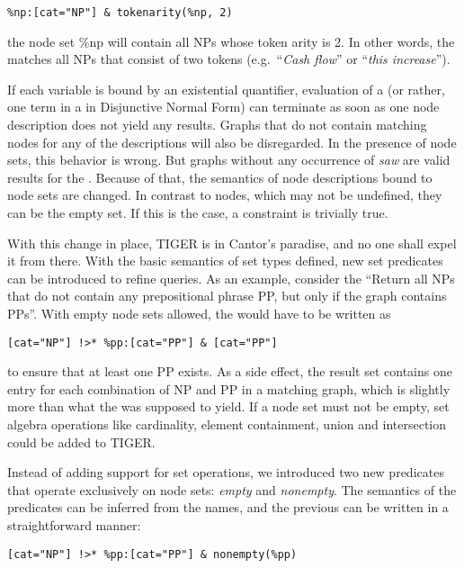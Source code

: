 \documentclass[output=paper]{LSP/langsci}
\begin{document}
\ea
\begin{lstlisting}
%np:[cat="NP"] & tokenarity(%np, 2)
\end{lstlisting}
\z

\noindent the node set \%np will contain all NPs whose token arity is 2. In other words, the  matches all NPs that consist of two tokens (e.g.~``\textit{Cash flow}'' or ``\textit{this increase}''). 

If each variable is bound by an existential quantifier, evaluation of a  (or rather, one term in a  in Disjunctive Normal Form) can terminate as soon as one node description does not yield any results. Graphs that do not contain matching nodes for any of the descriptions will also be disregarded. In the presence of node sets, this behavior is wrong. But graphs without any occurrence of \textit{saw} are valid results for the . Because of that, the semantics of node descriptions bound to node sets are changed. In contrast to nodes, which may not be undefined, they can be the empty set. If this is the case, a constraint is trivially true. 

With this change in place, TIGER is in Cantor's paradise, and no one shall expel it from there. With the basic semantics of set types defined, new set predicates can be introduced to refine queries. As an example, consider the  ``Return all NPs that do not contain any prepositional phrase PP, but only if the graph contains PPs''. With empty node sets allowed, the  would have to be written as

\ea
\begin{lstlisting}
[cat="NP"] !>* %pp:[cat="PP"] & [cat="PP"] 
\end{lstlisting}
\z

\noindent to ensure that at least one PP exists. As a side effect, the result set contains one entry for each combination of NP and PP in a matching graph, which is slightly more than what the  was supposed to yield. If a node set must not be empty, set algebra operations like cardinality, element containment, union and intersection could be added to TIGER. 

Instead of adding support for set operations, we introduced two new predicates that operate exclusively on node sets: \textit{empty} and \textit{nonempty}. The semantics of the predicates can be inferred from the names, and the previous  can be written in a straightforward manner:

\ea
\begin{lstlisting}
[cat="NP"] !>* %pp:[cat="PP"] & nonempty(%pp)
\end{lstlisting}
\z
\end{document}
